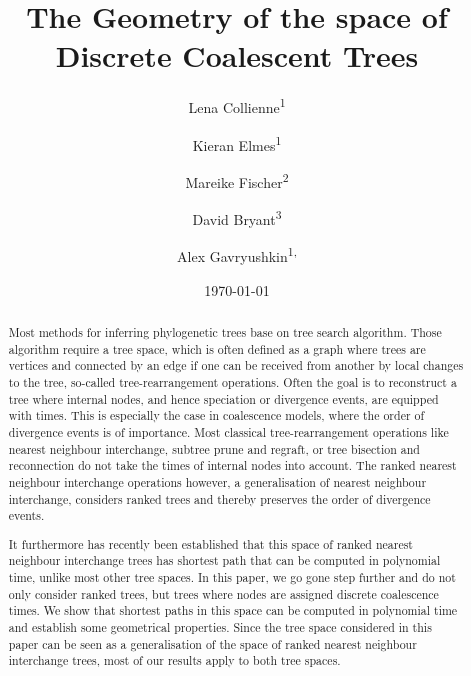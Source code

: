\documentclass[11pt]{amsart}
\title[Geometry of ranked tree spaces]{The Geometry of the space of Discrete Coalescent Trees}
\date{\today}
\author{Lena Collienne\textsuperscript{1}}
\author{Kieran Elmes\textsuperscript{1}}
\author{Mareike Fischer\textsuperscript{2}}
\author{David Bryant\textsuperscript{3}}
\author{Alex Gavryushkin\textsuperscript{1, \Letter}}
\begin{document}
\begin{abstract}
	Most methods for inferring phylogenetic trees base on tree search algorithm.
	Those algorithm require a tree space, which is often defined as a graph where trees are vertices and connected by an edge if one can be received from another by local changes to the tree, so-called tree-rearrangement operations.
	Often the goal is to reconstruct a tree where internal nodes, and hence speciation or divergence events, are equipped with times.
	This is especially the case in coalescence models, where the order of divergence events is of importance.
	Most classical tree-rearrangement operations like nearest neighbour interchange, subtree prune and regraft, or tree bisection and reconnection do not take the times of internal nodes into account.
	The ranked nearest neighbour interchange operations however, a generalisation of nearest neighbour interchange, considers ranked trees and thereby preserves the order of divergence events.

	It furthermore has recently been established that this space of ranked nearest neighbour interchange trees has shortest path that can be computed in polynomial time, unlike most other tree spaces.
	In this paper, we go gone step further and do not only consider ranked trees, but trees where nodes are assigned discrete coalescence times.
	We show that shortest paths in this space can be computed in polynomial time and establish some geometrical properties.
	Since the tree space considered in this paper can be seen as a generalisation of the space of ranked nearest neighbour interchange trees, most of our results apply to both tree spaces.
\end{abstract}

\maketitle
\end{document}

